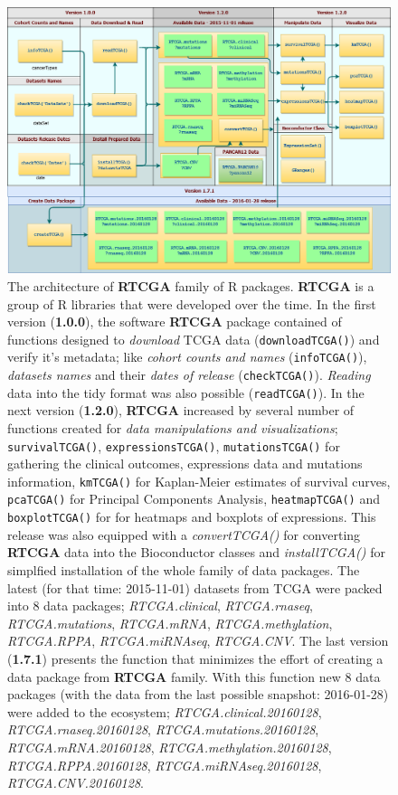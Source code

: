 \documentclass{bioinfo}
\begin{document}
\begin{figure}
\center
	\includegraphics[width=0.9\linewidth]{figures/RTCGA_workflow.png}
	\caption{The architecture of \textbf{RTCGA} family of R packages. \textbf{RTCGA} is a group of R libraries that were developed over the time. 
	\newline In the first version (\textbf{1.0.0}), the software \textbf{RTCGA} package contained of functions designed to \textit{download} TCGA data (\texttt{downloadTCGA()}) and verify it's metadata; like \textit{cohort counts and names} (\texttt{infoTCGA()}), \textit{datasets names} and their \textit{dates of release} (\texttt{checkTCGA()}). \textit{Reading} data into the tidy format was also possible (\texttt{readTCGA()}). 
	\newline In the next version (\textbf{1.2.0}), \textbf{RTCGA} increased by several number of functions created for \textit{data manipulations and visualizations}; \texttt{survivalTCGA()}, \texttt{expressionsTCGA()}, \texttt{mutationsTCGA()} for gathering the clinical outcomes, expressions data and mutations information, \texttt{kmTCGA()} for Kaplan-Meier estimates of survival curves, \texttt{pcaTCGA()} for Principal Components Analysis, \texttt{heatmapTCGA()} and \texttt{boxplotTCGA()} for for heatmaps and boxplots of expressions. This release was also equipped with a \textit{convertTCGA()} for converting \textbf{RTCGA} data into the Bioconductor classes and \textit{installTCGA()} for simplfied installation of the whole family of data packages. The latest (for that time: 2015-11-01) datasets from TCGA were packed into 8 data packages; \textit{RTCGA.clinical}, \textit{RTCGA.rnaseq}, \textit{RTCGA.mutations}, \textit{RTCGA.mRNA}, \textit{RTCGA.methylation}, \textit{RTCGA.RPPA}, \textit{RTCGA.miRNAseq}, \textit{RTCGA.CNV}.
	\newline The last version (\textbf{1.7.1}) presents the  function that minimizes the effort of creating a data package from \textbf{RTCGA} family. With this function new 8 data packages (with the data from the last possible snapshot: 2016-01-28) were added to the ecosystem; \newline \textit{RTCGA.clinical.20160128}, \textit{RTCGA.rnaseq.20160128}, \textit{RTCGA.mutations.20160128}, \textit{RTCGA.mRNA.20160128}, \textit{RTCGA.methylation.20160128}, \textit{RTCGA.RPPA.20160128}, \textit{RTCGA.miRNAseq.20160128}, \textit{RTCGA.CNV.20160128}.}
\label{fig:RTCGA_workflow_ver4}
\end{figure}
\end{document}
